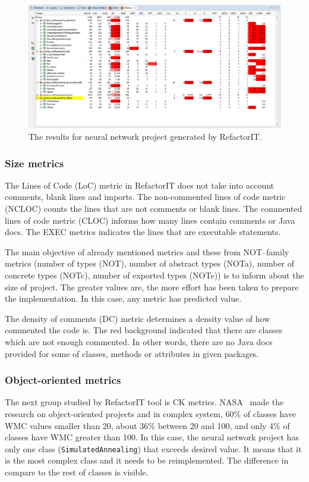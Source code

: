 \begin{figure}[h!]
	\centering
	\includegraphics[scale=0.45]{img/wyniki-refactorIT.png} 
	\caption{The results for neural network project generated by RefactorIT.}		
	\label{fig:wyniki}
\end{figure}

\subsubsection*{Size metrics}
The Lines of Code (\ac{LoC}) metric in RefactorIT does not take into account comments, blank lines and imports. The non-commented lines of code metric (\ac{NCLOC}) counts the lines that are not comments or blank lines. The commented lines of code metric (\ac{CLOC}) informs how many lines contain comments or Java docs. The \ac{EXEC} metrics indicates the lines that are executable statements. 

The main objective of already mentioned metrics and these from NOT--family metrics (number of types (\ac{NOT}), number of abstract types (\ac{NOTa}), number of concrete types (\ac{NOTc}), number of exported types (\ac{NOTe})) is to inform about the size of project. The greater values are, the more effort has been taken to prepare the implementation. In this case, any metric has predicted value.

The density of comments (\ac{DC}) metric determines a density value of how commented the code is. The red background indicated that there are classes which are not enough commented. In other words, there are no Java docs provided for some of classes, methods or attributes in given packages.

\subsubsection*{Object-oriented metrics}
The next group studied by RefactorIT tool is \ac{CK metrics}. NASA~\cite{nasa} made the research on object-oriented projects and in complex system, 60\% of classes have \ac{WMC} values smaller than 20, about 36\% between 20 and 100, and only 4\% of classes have \ac{WMC} greater than 100. In this case, the neural network project has only one class (\texttt{SimulatedAnnealing}) that exceeds desired value. It means that it is the most complex class and it needs to be reimplemented. The difference in compare to the rest of classes is visible. 

